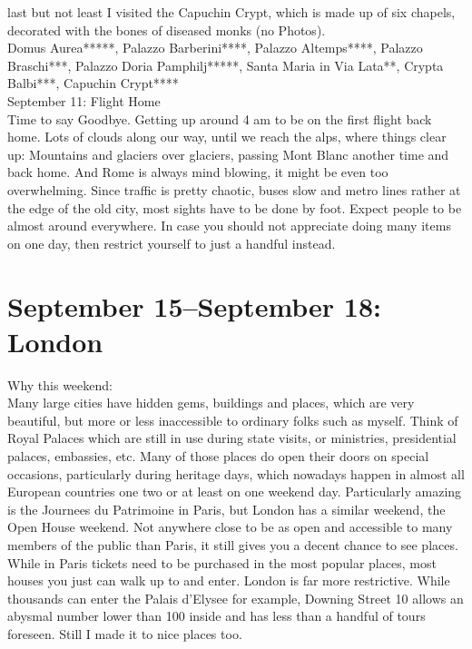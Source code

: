 last but not least I visited the Capuchin Crypt, which is made up of six chapels, decorated with the bones of diseased monks (no Photos).\\

Domus Aurea*****, Palazzo Barberini****, Palazzo Altemps****, Palazzo Braschi***, Palazzo Doria Pamphilj*****, Santa Maria in Via Lata**, Crypta Balbi***, Capuchin Crypt****\\

September 11: Flight Home\\
Time to say Goodbye. Getting up around 4 am to be on the first flight back home. Lots of clouds along our way, until we reach the alps, where things clear up: Mountains and glaciers over glaciers, passing Mont Blanc another time and back home. And Rome is always mind blowing, it might be even too overwhelming. Since traffic is pretty chaotic, buses slow and metro lines rather at the edge of the old city, most sights have to be done by foot. Expect people to be almost around everywhere. In case you should not appreciate doing many items on one day, then restrict yourself to just a handful instead.


\section{September 15--September 18: London}
\label{London2017}

Why this weekend:\\
Many large cities have hidden gems, buildings and places, which are very beautiful, but more or less inaccessible to ordinary folks such as myself. Think of Royal Palaces which are still in use during state visits, or ministries, presidential palaces, embassies, etc. Many of those places do open their doors on special occasions, particularly during heritage days, which nowadays happen in almost all European countries one two or at least on one weekend day. Particularly amazing is the Journees du Patrimoine in Paris, but London has a similar weekend, the Open House weekend. Not anywhere close to be as open and accessible to many members of the public than Paris, it still gives you a decent chance to see places. While in Paris tickets need to be purchased in the most popular places, most houses you just can walk up to and enter. London is far more restrictive. While thousands can enter the Palais d'Elysee for example, Downing Street 10 allows an abysmal number lower than 100 inside and has less than a handful of tours foreseen. Still I made it to nice places too.\\

